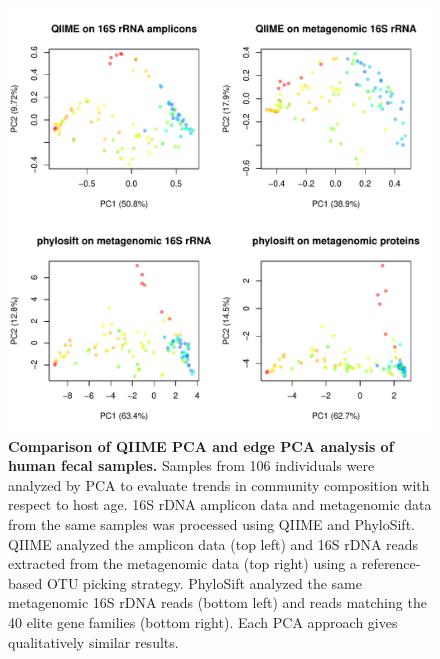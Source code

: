 \documentclass[10pt]{article}
\begin{document}
\begin{figure}[hp]
\begin{center}
\includegraphics[width=6in]{figures/allofem.pdf}
\end{center}
\caption{\textbf{Comparison of QIIME PCA and edge PCA analysis of human fecal samples.} Samples from 106 individuals were analyzed by PCA to evaluate trends in community composition with respect to host age. 16S rDNA amplicon data and metagenomic data from the same samples was processed using QIIME and PhyloSift. QIIME analyzed the amplicon data (top left) and 16S rDNA reads extracted from the metagenomic data (top right) using a reference-based OTU picking strategy. PhyloSift analyzed the same metagenomic 16S rDNA reads (bottom left) and reads matching the 40 elite gene families (bottom right). Each PCA approach gives qualitatively similar results.}
\label{fig:agepca}
\end{figure}
\end{document}
